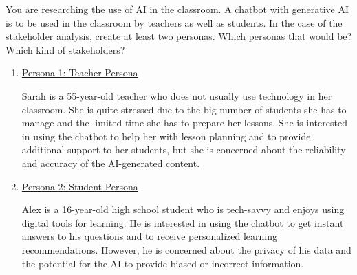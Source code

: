 \begin{ejercicio}
    You  are researching the use of AI in the classroom. A chatbot with generative AI is to be used in the classroom by teachers as well as students. In the case of the stakeholder analysis, create at least two personas. Which personas that would be? Which kind of stakeholders?
    \begin{enumerate}
        \item \ul{Persona 1: Teacher Persona}
        
        Sarah is a 55-year-old teacher who does not usually use technology in her classroom. She is quite stressed due to the big number of students she has to manage and the limited time she has to prepare her lessons. She is interested in using the chatbot to help her with lesson planning and to provide additional support to her students, but she is concerned about the reliability and accuracy of the AI-generated content.

        \item \ul{Persona 2: Student Persona}
        
        Alex is a 16-year-old high school student who is tech-savvy and enjoys using digital tools for learning. He is interested in using the chatbot to get instant answers to his questions and to receive personalized learning recommendations. However, he is concerned about the privacy of his data and the potential for the AI to provide biased or incorrect information.
    \end{enumerate}
\end{ejercicio}

